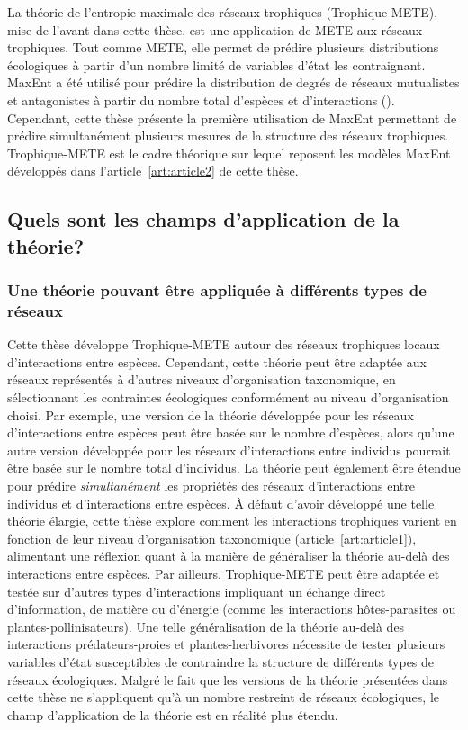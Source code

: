 La théorie de l'entropie maximale des réseaux trophiques (Trophique-METE), mise
de l'avant dans cette thèse, est une application de METE aux réseaux trophiques.
Tout comme METE, elle permet de prédire plusieurs distributions écologiques à
partir d'un nombre limité de variables d'état les contraignant. MaxEnt a été
utilisé pour prédire la distribution de degrés de réseaux mutualistes et
antagonistes à partir du nombre total d'espèces et d'interactions
(\cite{Williams2011Biology}). Cependant, cette thèse présente la première
utilisation de MaxEnt permettant de prédire simultanément plusieurs mesures de
la structure des réseaux trophiques. Trophique-METE est le cadre théorique sur
lequel reposent les modèles MaxEnt développés dans l'article~\ref{art:article2}
de cette thèse.

\subsection{Quels sont les champs d'application de la théorie?} 

\subsubsection{Une théorie pouvant être appliquée à différents types de réseaux} 

Cette thèse développe Trophique-METE autour des réseaux trophiques locaux
d'interactions entre espèces. Cependant, cette théorie peut être adaptée aux
réseaux représentés à d'autres niveaux d'organisation taxonomique, en
sélectionnant les contraintes écologiques conformément au niveau d'organisation
choisi. Par exemple, une version de la théorie développée pour les réseaux
d'interactions entre espèces peut être basée sur le nombre d'espèces, alors
qu'une autre version développée pour les réseaux d'interactions entre individus
pourrait être basée sur le nombre total d'individus. La théorie peut également
être étendue pour prédire \textit{simultanément} les propriétés des réseaux
d'interactions entre individus et d'interactions entre espèces. À défaut d'avoir
développé une telle théorie élargie, cette thèse explore comment les
interactions trophiques varient en fonction de leur niveau d'organisation
taxonomique (article~\ref{art:article1}), alimentant une réflexion quant à la
manière de généraliser la théorie au-delà des interactions entre espèces. Par
ailleurs, Trophique-METE peut être adaptée et testée sur d'autres types
d'interactions impliquant un échange direct d'information, de matière ou
d'énergie (comme les interactions hôtes-parasites ou plantes-pollinisateurs).
Une telle généralisation de la théorie au-delà des interactions
prédateurs-proies et plantes-herbivores nécessite de tester plusieurs variables
d'état susceptibles de contraindre la structure de différents types de réseaux
écologiques. Malgré le fait que les versions de la théorie présentées dans cette
thèse ne s'appliquent qu'à un nombre restreint de réseaux écologiques, le champ
d'application de la théorie est en réalité plus étendu.

